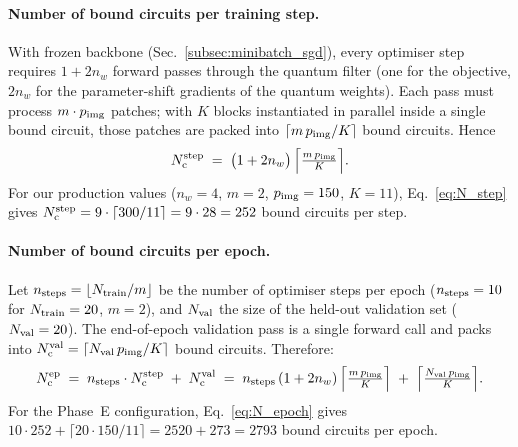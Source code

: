 \paragraph{Number of bound circuits per training step.}
With frozen backbone (Sec.~\ref{subsec:minibatch_sgd}), every optimiser step
requires $1+2n_w$ forward passes through the quantum filter (one for the
objective, $2n_w$ for the parameter-shift gradients of the quantum weights).
Each pass must process $m\cdot p_{\rm img}$ patches; with $K$ blocks
instantiated in parallel inside a single bound circuit, those patches are
packed into $\lceil m\,p_{\rm img}/K\rceil$ bound circuits. Hence
\begin{equation}
N_{\rm c}^{\rm step}
\;=\; \bigl(1+2 n_w\bigr)\,\Bigl\lceil \tfrac{m\,p_{\rm img}}{K} \Bigr\rceil .
\label{eq:N_step}
\end{equation}
For our production values ($n_w=4$, $m=2$, $p_{\rm img}=150$, $K=11$),
Eq.~\eqref{eq:N_step} gives $N_{\rm c}^{\rm step}=9\cdot\lceil 300/11\rceil = 9\cdot 28 = 252$
bound circuits per step.

\paragraph{Number of bound circuits per epoch.}
Let $n_{\rm steps}=\lfloor N_{\rm train}/m\rfloor$ be the number of optimiser
steps per epoch ($n_{\rm steps}=10$ for $N_{\rm train}=20$, $m=2$), and
$N_{\rm val}$ the size of the held-out validation set ($N_{\rm val}=20$). The
end-of-epoch validation pass is a single forward call and packs into
$N_{\rm c}^{\rm val}=\lceil N_{\rm val}\, p_{\rm img}/K\rceil$ bound circuits.
Therefore:
\begin{equation}
N_{\rm c}^{\rm ep}
\;=\; n_{\rm steps}\cdot N_{\rm c}^{\rm step} \;+\; N_{\rm c}^{\rm val}
\;=\; n_{\rm steps}\,(1+2 n_w)\,\Bigl\lceil \tfrac{m\,p_{\rm img}}{K} \Bigr\rceil
       \;+\; \Bigl\lceil \tfrac{N_{\rm val}\,p_{\rm img}}{K} \Bigr\rceil .
\label{eq:N_epoch}
\end{equation}
For the Phase~E configuration, Eq.~\eqref{eq:N_epoch} gives
$10\cdot 252 + \lceil 20\cdot 150/11\rceil = 2520 + 273 = 2793$ bound circuits
per epoch.


